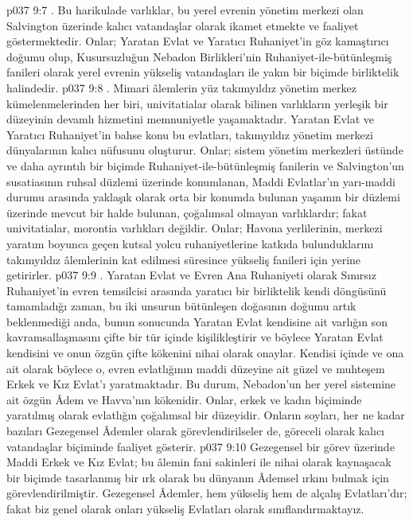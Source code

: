 \vs p037 9:7 . Bu harikulade varlıklar, bu yerel evrenin yönetim merkezi olan Salvington üzerinde kalıcı vatandaşlar olarak ikamet etmekte ve faaliyet göstermektedir. Onlar; Yaratan Evlat ve Yaratıcı Ruhaniyet’in göz kamaştırıcı doğumu olup, Kusursuzluğun Nebadon Birlikleri’nin Ruhaniyet\hyp{}ile\hyp{}bütünleşmiş fanileri olarak yerel evrenin yükseliş vatandaşları ile yakın bir biçimde birliktelik halindedir.
\vs p037 9:8 . Mimari âlemlerin yüz takımyıldız yönetim merkez kümelenmelerinden her biri, univitatialar olarak bilinen varlıkların yerleşik bir düzeyinin devamlı hizmetini memnuniyetle yaşamaktadır. Yaratan Evlat ve Yaratıcı Ruhaniyet’in bahse konu bu evlatları, takımyıldız yönetim merkezi dünyalarının kalıcı nüfusunu oluşturur. Onlar; sistem yönetim merkezleri üstünde ve daha ayrıntılı bir biçimde Ruhaniyet\hyp{}ile\hyp{}bütünleşmiş fanilerin ve Salvington’un susatiasının ruhsal düzlemi üzerinde konumlanan, Maddi Evlatlar’ın yarı\hyp{}maddi durumu arasında yaklaşık olarak orta bir konumda bulunan yaşamın bir düzlemi üzerinde mevcut bir halde bulunan, çoğalımsal olmayan varlıklardır; fakat univitatialar, morontia varlıkları değildir. Onlar; Havona yerlilerinin, merkezi yaratım boyunca geçen kutsal yolcu ruhaniyetlerine katkıda bulunduklarını takımyıldız âlemlerinin kat edilmesi süresince yükseliş fanileri için yerine getirirler.
\vs p037 9:9 . Yaratan Evlat ve Evren Ana Ruhaniyeti olarak Sınırsız Ruhaniyet’in evren temsilcisi arasında yaratıcı bir birliktelik kendi döngüsünü tamamladığı zaman, bu iki unsurun bütünleşen doğasının doğumu artık beklenmediği anda, bunun sonucunda Yaratan Evlat kendisine ait varlığın son kavramsallaşmasını çifte bir tür içinde kişilikleştirir ve böylece Yaratan Evlat kendisini ve onun özgün çifte kökenini nihai olarak onaylar. Kendisi içinde ve ona ait olarak böylece o, evren evlatlığının maddi düzeyine ait güzel ve muhteşem Erkek ve Kız Evlat’ı yaratmaktadır. Bu durum, Nebadon’un her yerel sistemine ait özgün Âdem ve Havva’nın kökenidir. Onlar, erkek ve kadın biçiminde yaratılmış olarak evlatlığın çoğalımsal bir düzeyidir. Onların soyları, her ne kadar bazıları Gezegensel Âdemler olarak görevlendirilseler de, göreceli olarak kalıcı vatandaşlar biçiminde faaliyet gösterir.
\vs p037 9:10 Gezegensel bir görev üzerinde Maddi Erkek ve Kız Evlat; bu âlemin fani sakinleri ile nihai olarak kaynaşacak bir biçimde tasarlanmış bir ırk olarak bu dünyanın Âdemsel ırkını bulmak için görevlendirilmiştir. Gezegensel Âdemler, hem yükseliş hem de alçalış Evlatları’dır; fakat biz genel olarak onları yükseliş Evlatları olarak sınıflandırmaktayız.
